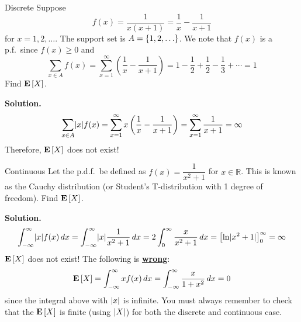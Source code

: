 \begin{Example}{Discrete}{}
    Suppose
    \[ f(x)=\frac{1}{x(x+1)}=\frac{1}{x} -\frac{1}{x+1}  \]
    for $ x=1,2,\ldots $. The support set is $ A=\{1,2,\ldots\} $.
    We note that $ f(x) $ is a p.f.\ since
    $ f(x)\geqslant 0 $ and
    \[ \sum\limits_{x\in A}f(x)=\sum\limits_{x=1}^{\infty}
        \left( \frac{1}{x} -\frac{1}{x+1} \right)=
        1-\frac{1}{2} +\frac{1}{2} -\frac{1}{3} +\cdots=1  \]
    Find $ \bm{\mathrm{E}}\left[X\right] $.

    \textbf{Solution.}
    \[ \sum\limits_{x\in A}\lvert x\rvert f(x)=\sum\limits_{x=1}^{\infty}
        x\left( \frac{1}{x} -\frac{1}{x+1} \right)
        =\sum\limits_{x=1}^{\infty} \frac{1}{x+1} =\infty  \]
    Therefore, $ \bm{\mathrm{E}}\left[X\right] $ does not exist!
\end{Example}

\begin{Example}{Continuous}{}
    Let the p.d.f.\ be defined as $ f(x)=\dfrac{1}{x^2+1} $ for
    $ x\in\mathbb{R} $. This is known as the Cauchy distribution
    (or Student's T-distribution with 1 degree of freedom). Find $ \bm{\mathrm{E}}\left[X\right] $.

    \textbf{Solution.}
    \[ \int_{-\infty}^{\infty} \lvert x\rvert f(x)\, d{x} =
        \int_{-\infty}^{\infty} \lvert x\rvert\frac{1}{x^2+1} \, d{x}=
        2 \int_{0}^{\infty} \frac{x}{x^2+1} \, d{x} =
        \bigl[\ln\lvert x^2+1\rvert\bigr]_0^\infty=\infty \]
    $ \bm{\mathrm{E}}\left[X\right] $ does not exist! The following is \underline{\textbf{wrong}}:
    \[ \bm{\mathrm{E}}\left[X\right]=\int_{-\infty}^{\infty}x f(x)\, d{x}=
        \int_{-\infty}^{\infty} \frac{x}{1+x^2} \, d{x}=0  \]
    since the integral above with $ \lvert x\rvert $ is infinite. You must
    always remember to check that the $ \bm{\mathrm{E}}\left[X\right] $ is finite
    (using $ \lvert X\rvert $) for both the discrete and continuous case.
\end{Example}

